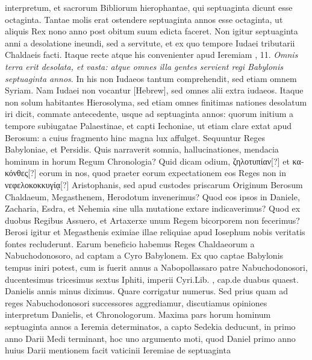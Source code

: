 interpretum, et sacrorum Bibliorum hierophantae, qui septuaginta
dicunt esse octaginta.
Tantae molis erat ostendere septuaginta
annos esse octaginta, ut aliquis Rex nono anno post obitum
suum edicta faceret.
Non igitur septuaginta anni a desolatione
ineundi, sed a servitute, et ex quo tempore Iudaei tributarii
Chaldaeis facti.
Itaque recte atque his convenienter apud Ieremiam
, 11.
\textit{Omnis terra erit desolata, et vasta: atque omnes
illa gentes servient regi Babylonis septuaginta annos}.
In his non Iudaeos
tantum comprehendit, sed etiam omnem Syriam.
Nam Iudaei
non vocantur \texthebrew{}[Hebrew], sed omnes alii extra iudaeos.
%
Itaque non solum
habitantes Hierosolyma, sed etiam omnes finitimas nationes desolatum
iri dicit, commate antecedente, usque ad septuaginta annos:
quorum initium a tempore subiugatae Palaestinae, et capti Iechoniae,
ut etiam clare extat apud Berosum: a cuius fragmento hinc
magna lux affulget.
Sequuntur Reges Babyloniae, et Persidis.
Quis narraverit somnia, hallucinationes, mendacia hominum in horum
Regum Chronologia?
Quid dicam odium, \textgreek{ζηλοτυπίαν[?]} et \textgreek{κακόνθες[?]}
eorum in nos, quod praeter eorum expectationem eos Reges non
in \textgreek{νεφελοκοκκυγίᾳ[?]} Aristophanis, sed apud custodes priscarum Originum
Berosum Chaldaeum, Megasthenem, Herodotum invenerimus?
Quod eos ipsos in Daniele, Zacharia, Esdra, et Nehemia sine
ulla mutatione extare indicaverimus?
Quod ex duobus Regibus
Assuero, et Artaxerxe unum Regem bicorporem non fecerimus?
Berosi igitur et Megasthenis eximiae illae reliquiae apud Iosephum
nobis veritatis fontes recluderunt.
Earum beneficio habemus Reges
Chaldaeorum a Nabuchodonosoro, ad captam a Cyro Babylonem.
Ex quo captae Babylonis tempus iniri potest, cum is fuerit annus
 a Nabopollassaro patre Nabuchodonosori, ducentesimus
tricesimus sextus Iphiti,
  imperii Cyri.Lib. , cap.de duabus
quaest.
Danielis  annis minus diximus.
Quare corrigatur
numerus.
Sed prius quam ad reges Nabuchodonosori successores aggrediamur,
discutiamus opiniones interpretum Danielis, et Chronologorum.
Maxima pars horum hominum septuaginta annos a
Ieremia determinatos, a capto Sedekia deducunt, in primo anno
Darii Medi terminant, hoc uno argumento moti, quod Daniel primo
anno huius Darii mentionem facit vaticinii Ieremiae de septuaginta
